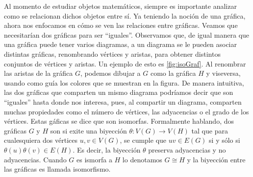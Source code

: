 Al momento de estudiar objetos matem\'aticos, siempre es importante analizar
como se relacionan dichos objetos entre s\'i. Ya teniendo la noci\'on de una
gr\'afica, ahora nos enfocamos en c\'omo se ven las relaciones entre gr\'aficas.
Veamos que necesitar\'ian dos gr\'aficas para ser ``iguales''. Observamos que,
de igual manera que una gr\'afica puede tener varios diagramas, a un diagrama se
le pueden asociar distintas gr\'aficas, renombrando v\'ertices y aristas, para
obtener distintos conjuntos de v\'ertices y aristas. Un ejemplo de esto es
\cref{fig:isoGraf}. Al renombrar las aristas de la gr\'afica $G$, podemos
dibujar a $G$ como la gr\'afica $H$ y viseversa, usando como gu\'ia los colores
que se muestran en la figura. De manera intuitiva, las dos gr\'aficas que
comparten un mismo diagrama podr\'iamos decir que son ``iguales'' hasta donde
nos interesa, pues, al compartir un diagrama, comparten muchas propiedades como
el n\'umero de v\'ertices, las adyacencias o el grado de los v\'ertices. Estas
g\'aficas se dice que son isomorfas. Formalmente hablando, dos gr\'aficas $G$ y
$H$ son  si exite una biyecci\'on $\theta: V(G)
\rightarrow V(H)$ tal que para cualesquiera dos v\'ertices $u, v \in V(G)$, se
cumple que $uv \in E(G)$ si y s\'olo si $\theta(u)\theta(v) \in E(H)$. Es decir,
la biyecci\'on $\theta$ preserva adyacencias y no adyacencias. Cuando $G$ es
ismorfa a $H$ lo denotamos $G \cong H$ y la biyecci\'on entre las gr\'aficas es
llamada isomorfismo.

